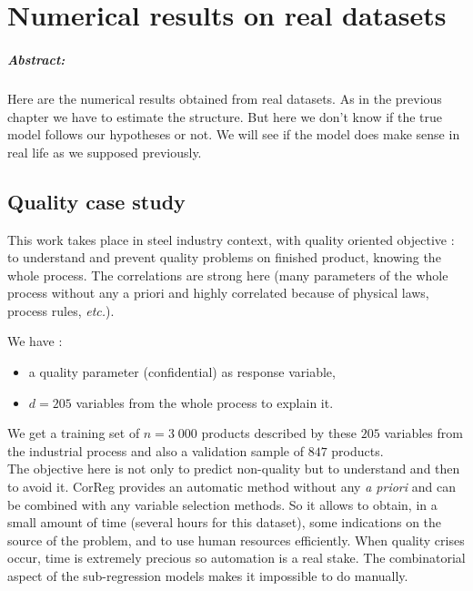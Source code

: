 \documentclass[12pt,a4paper]{report}
\begin{document}
\chapter{Numerical results on real datasets} \label{sectionrealcase}
\paragraph{Abstract:} Here are the numerical results obtained from real datasets. As in the previous chapter we have to estimate the structure. But here we don't know if the true model follows our hypotheses or not. We will see if the model does make sense in real life as we supposed previously.

	\section{Quality case study} \label{sectionexfos}
This work takes place in steel industry context, with quality oriented objective : to understand and prevent quality problems on finished product, knowing the whole process. The correlations are strong here (many parameters of the whole process without any a priori and highly correlated because of physical laws, process rules, {\it etc.}). 
		
We have :
		\begin{itemize}
			\item a quality parameter (confidential) as response variable,
			\item $d=205$ variables from the whole process to explain it.
		\end{itemize}
We get a training set of $n=3\;000$ products described by these $205$ variables from the industrial process and also a validation sample of $847$ products.\\

The objective here is not only to predict non-quality but to understand and then to avoid it. {\sc CorReg} provides an automatic method without any {\it a priori} and can be combined with any variable selection methods. So it allows to obtain, in a small amount of time (several hours for this dataset), some indications on the source of the problem, and to use human resources efficiently. When quality crises occur, time is extremely precious so automation is a real stake. The combinatorial aspect of the sub-regression models makes it impossible to do manually.\\

\end{document}
